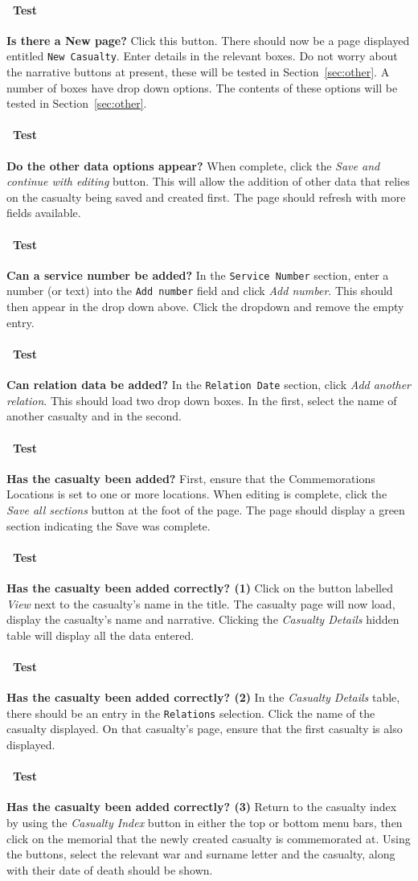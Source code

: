 \documentclass[12pt]{article}
\newcounter{Test}
\newcommand{\test}[1]{%
\stepcounter{Test}%
\paragraph{\Circle\ Test \theTest} \textbf{#1} }
\begin{document}
\test{Is there a New page?}
Click this button. There should now be a page displayed entitled \texttt{New Casualty}. Enter details in the relevant boxes. Do not worry about the narrative buttons at present, these will be tested in Section~\ref{sec:other}. A number of boxes have drop down options. The contents of these options will be tested in Section~\ref{sec:other}.

\test{Do the other data options appear?}
When complete, click the \textit{Save and continue with editing} button. This will allow the addition of other data that relies on the casualty being saved and created first. The page should refresh with more fields available.

\test{Can a service number be added?}
In the \texttt{Service Number} section, enter a number (or text) into the \texttt{Add number} field and click \textit{Add number}. This should then appear in the drop down above. Click the dropdown and remove the empty entry.

\test{Can relation data be added?}
In the \texttt{Relation Date} section, click \textit{Add another relation}. This should load two drop down boxes. In the first, select the name of another casualty and in the second.

\test{Has the casualty been added?}
First, ensure that the Commemorations Locations is set to one or more locations. When editing is complete, click the \textit{Save all sections} button at the foot of the page. The page should display a green section indicating the Save was complete.

\test{Has the casualty been added correctly? (1)}
Click on the button labelled \textit{View} next to the casualty's name in the title. The casualty page will now load, display the casualty's name and narrative. Clicking the \textit{Casualty Details} hidden table will display all the data entered.

\test{Has the casualty been added correctly? (2)}
In the \textit{Casualty Details} table, there should be an entry in the \texttt{Relations} selection. Click the name of the casualty displayed. On that casualty's page, ensure that the first casualty is also displayed.

\test{Has the casualty been added correctly? (3)}
Return to the casualty index by using the \textit{Casualty Index} button in either the top or bottom menu bars, then click on the memorial that the newly created casualty is commemorated at. Using the buttons, select the relevant war and surname letter and the casualty, along with their date of death should be shown.
\end{document}

